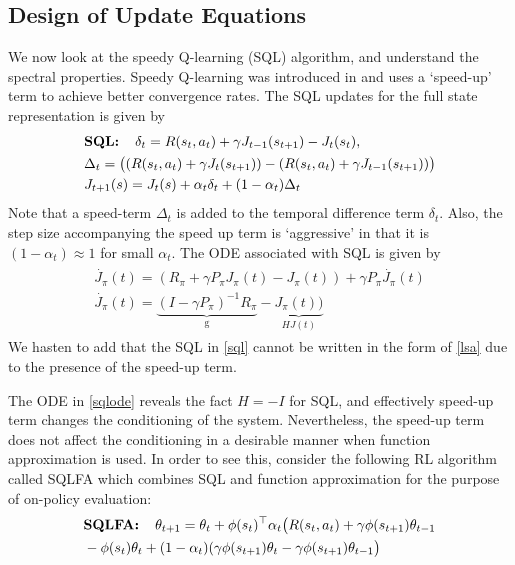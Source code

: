 \subsection{Design of Update Equations}
We now look at the speedy Q-learning (SQL) algorithm, and understand the spectral properties. Speedy Q-learning was introduced in \cite{} and uses a `speed-up' term to achieve better convergence rates. The SQL updates for the full state representation is given by
\begin{align}\label{sql}
\begin{split}
&\textbf{SQL:\quad}\delta_t=R(s_t,a_t)+\gamma J_{t-1}(s_{t+1})-J_{t}(s_t),\\
&\Delta_t= \big((R(s_t,a_t)+\gamma J_t(s_{t+1}))-(R(s_t,a_t)+\gamma J_{t-1}(s_{t+1}))\big)\\&J_{t+1}(s)=J_t(s)+\alpha_t\delta_t+(1-\alpha_t)\Delta_t
\end{split}
\end{align}
Note that a speed-term $\Delta_t$ is added to the temporal difference term $\delta_t$. Also, the step size accompanying the speed up term is `aggressive’ in that it is $(1-\alpha_t)\approx 1$ for small $\alpha_t$. The ODE associated with SQL is given by
\begin{align}
\begin{split}
\dot{J_\pi}(t)=(R_\pi+\gamma P_\pi J_\pi(t) -J_\pi(t))+\gamma P_\pi\dot{J_\pi}(t)\\
\dot{J_\pi}(t)=\underbrace{(I-\gamma P_\pi)^{-1}R_\pi}_{\text{g}}-\underbrace{J_\pi(t))}_{HJ(t)}
\end{split}
\end{align}
We hasten to add that the SQL in \eqref{sql} cannot be written in the form of \eqref{lsa} due to the presence of the speed-up term.\par 
The ODE in \eqref{sqlode} reveals the fact $H=-I$ for SQL, and effectively speed-up term changes the conditioning of the system. Nevertheless, the speed-up term does not affect the conditioning in a desirable manner when function approximation is used. In order to see this, consider the following RL algorithm called SQLFA which combines SQL and function approximation for the purpose of on-policy evaluation:
\begin{align}\label{sqlfa}
\begin{split}
&\textbf{SQLFA:\quad}\theta_{t+1}=\theta_t+\phi(s_t)^\top \alpha_t\big(R(s_t,a_t)+\gamma \phi(s_{t+1})\theta_{t-1}\\&-\phi(s_t)\theta_t +(1-\alpha_t)(\gamma \phi(s_{t+1})\theta_t-\gamma \phi(s_{t+1})\theta_{t-1}\big)
\end{split}
\end{align}
